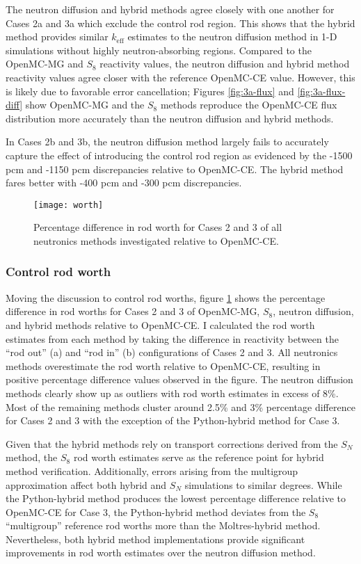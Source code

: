 The neutron diffusion and hybrid methods agree closely with one another for Cases 2a and 3a which
exclude the control rod region. This shows that the hybrid method provides similar $k_\text{eff}$
estimates to the neutron diffusion method in 1-D simulations without highly neutron-absorbing
regions. Compared to the OpenMC-MG and $S_8$ reactivity values, the neutron diffusion and hybrid
method reactivity values agree closer with the reference OpenMC-CE value. However, this is likely
due to favorable error cancellation; Figures \ref{fig:3a-flux} and \ref{fig:3a-flux-diff} show
OpenMC-MG and the $S_8$ methods reproduce
the OpenMC-CE flux distribution more accurately than the neutron diffusion and hybrid methods.

In Cases 2b and 3b, the neutron diffusion method largely fails to accurately capture the
effect of introducing the control rod region as evidenced by the -1500 pcm and -1150 pcm
discrepancies relative to OpenMC-CE. The hybrid method fares better with -400 pcm and -300 pcm
discrepancies.

\begin{figure}[htb!]
  \centering
  \texttt{[image: worth]}
  \caption{Percentage difference in rod worth for Cases 2 and 3 of all neutronics methods
  investigated relative to OpenMC-CE.}
  \label{fig:1d-worth}
\end{figure}

\subsubsection{Control rod worth}

Moving the discussion to control rod worths, figure \ref{fig:1d-worth} shows the percentage
difference in rod worths for Cases 2 and 3 of OpenMC-MG, $S_8$, neutron diffusion, and hybrid
methods relative to OpenMC-CE. I calculated the rod worth estimates from each method by taking the
difference in reactivity between the ``rod out'' (a) and ``rod in'' (b) configurations of Cases 2
and 3. All neutronics methods overestimate the rod worth relative to OpenMC-CE, resulting in
positive percentage difference values observed in the figure.
The neutron diffusion methods clearly show up as outliers with rod worth estimates in excess
of 8\%. Most of the remaining methods cluster around 2.5\% and 3\% percentage difference for Cases
2 and 3 with the exception of the Python-hybrid method for Case 3.

Given that the hybrid methods rely on transport corrections derived from the $S_N$ method, the
$S_8$ rod worth estimates serve as the
reference point for hybrid method verification. Additionally, errors arising from the multigroup
approximation affect both hybrid and $S_N$ simulations to similar degrees. While the Python-hybrid
method produces the lowest percentage difference relative to OpenMC-CE for Case 3, the
Python-hybrid method deviates from the $S_8$ ``multigroup'' reference rod worths more than the
Moltres-hybrid method. Nevertheless, both hybrid method implementations provide significant
improvements in rod worth estimates over the neutron diffusion method.

